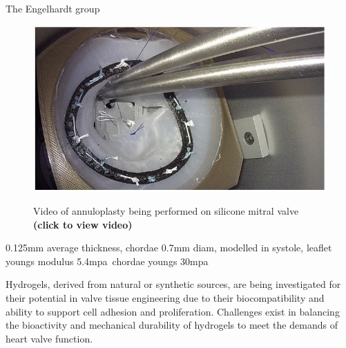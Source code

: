 The Engelhardt group 
\begin{figure}[H]
    \centering
    \href{https://link.springer.com/article/10.1007/s11548-019-01971-9#MOESM1}{\includegraphics[width=\linewidth]{figures/Engel}}%
    \caption{Video of annuloplasty being performed on silicone mitral valve \textbf{(click to view video)}}
    \label{fig:Videos}
\end{figure}

\newthought{}

0.125mm average thickness, chordae 0.7mm diam, modelled in systole, leaflet youngs modulus 5.4mpa\ chordae youngs 30mpa

Hydrogels, derived from natural or synthetic sources, are being investigated for their potential in valve tissue engineering due to their biocompatibility and ability to support cell adhesion and proliferation. Challenges exist in balancing the bioactivity and mechanical durability of hydrogels to meet the demands of heart valve function.



